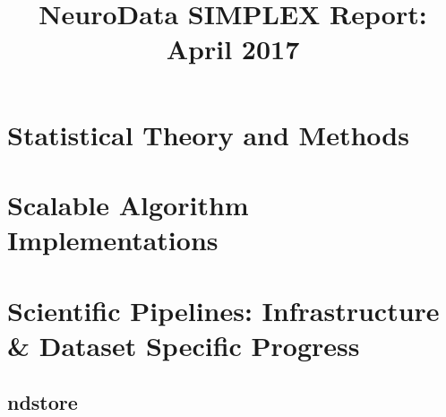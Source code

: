 \documentclass[12pt]{article}
\title{NeuroData SIMPLEX Report: April 2017}
\begin{document}

\newpage



\section{Statistical Theory and Methods}
%




%
%

%
%
%
%

\section{Scalable Algorithm Implementations}

%
%

%

%

\section{Scientific Pipelines: Infrastructure \& Dataset Specific Progress}

%
\subsection{ndstore}
%
%
%





%
\end{document}
